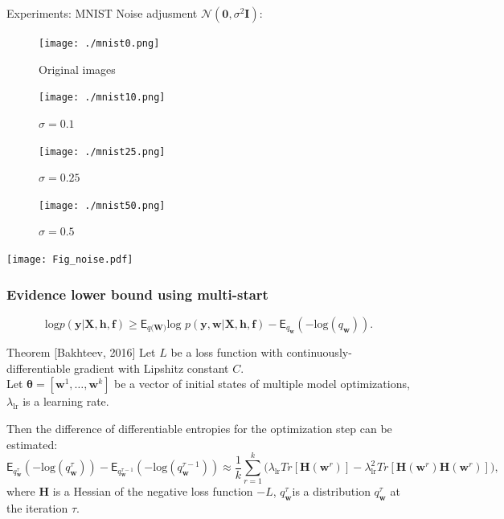 \documentclass[usenames,dvipsnames,11pt,pdf,utf8,russian,aspectratio=43]{beamer}
\begin{document}
\begin{frame}{Experiments: MNIST}
Noise adjusment $\mathcal{N}(\mathbf{0},\sigma^2\mathbf{I})$:
\setlength{\columnsep}{10pt}
\begin{multicols}{4}
\begin{figure}[h]
\texttt{[image: ./mnist0.png]}
\caption*{Original images}
\end{figure}

\begin{figure}[h]
\texttt{[image: ./mnist10.png]}
\caption*{$\sigma=0.1$}
\end{figure}

\begin{figure}[h]
\texttt{[image: ./mnist25.png]}
\caption*{$\sigma=0.25$}
\end{figure}

\begin{figure}[h]
\texttt{[image: ./mnist50.png]}
\caption*{$\sigma=0.5$}
\end{figure}
\end{multicols}
\begin{center}
\texttt{[image: Fig\_noise.pdf]}
\end{center}
\end{frame}


\begin{frame}
\small
\frametitle{Evidence lower bound using multi-start}
$$\text{log}p(\mathbf{y}|\mathbf{X}, \mathbf{h},\mathbf{f}) \geq \mathsf{E}_{q(\mathbf{W)}}\text{log~}p (\mathbf{y}, \mathbf{w}|\mathbf{X}, \mathbf{h},\mathbf{f}) - \mathsf{E}_{q_{\mathbf{w}}}(-\text{log}(q_\mathbf{w})).$$

\begin{block}{Theorem [Bakhteev, 2016]} Let  $L$ be a loss function with continuously-differentiable gradient with Lipshitz constant $C$. \\
Let $\boldsymbol{\theta} = [\mathbf{w}^1,\dots,\mathbf{w}^k]$ be a vector of initial states of multiple model optimizations, $\lambda_\text{lr}$ is a learning rate.

Then the difference of differentiable entropies for the optimization step can be estimated:
\small
\[
	\mathsf{E}_{q^{\tau}_{\mathbf{w}}}(-\text{log}(q^{\tau}_\mathbf{w})) -  \mathsf{E}_{q^{\tau-1}_{\mathbf{w}}}(-\text{log}(q^{\tau-1}_\mathbf{w}))  \approx  \frac{1}{k}\sum_{r=1}^k \bigl(\lambda_\text{lr} Tr[\mathbf{H}(\mathbf{w}^r)] - \lambda_\text{lr}^2 Tr[\mathbf{H}(\mathbf{w}^r)\mathbf{H}(\mathbf{w}^r)]  \bigr),
\]
where $\mathbf{H}$ is a Hessian of the negative loss function $-L$, $q^{\tau}_\mathbf{w}$is a distribution $q^{\tau}_\mathbf{w}$ at the iteration $\tau$.
\end{block}
\end{frame}
\end{document}
